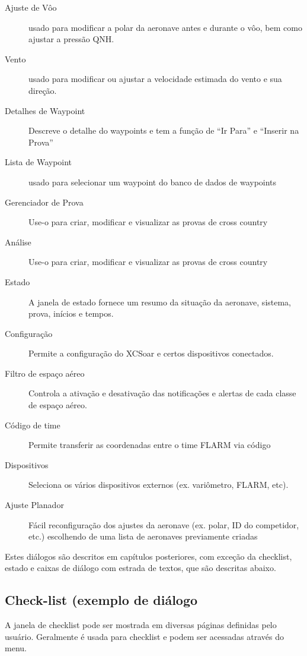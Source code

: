 \begin{description}
\item[Ajuste de Vôo] usado para modificar a polar da aeronave antes e durante o vôo, bem como ajustar a pressão QNH.
\item[Vento] usado para modificar ou ajustar a velocidade estimada do vento e sua direção. 
\item[Detalhes de Waypoint] Descreve o detalhe do waypoints e tem a função de “Ir Para” e “Inserir na Prova”
\item[Lista de Waypoint] usado para selecionar um waypoint do banco de dados de waypoints
\item[Gerenciador de Prova]Use-o para criar, modificar e visualizar as provas de cross country
\item[Análise] Use-o para criar, modificar e visualizar as provas de cross country
\item[Estado] A janela de estado fornece um resumo da situação da aeronave, sistema, prova, inícios e tempos.
\item[Configuração] Permite a configuração do XCSoar e certos dispositivos conectados.
\item[Filtro de espaço aéreo] Controla a ativação e desativação das notificações e alertas de cada classe de espaço aéreo.
\item[Código de time] Permite transferir as coordenadas entre o time FLARM via código
\item[Dispositivos]  Seleciona os vários dispositivos externos (ex. variômetro, FLARM, etc).
\item[Ajuste Planador]  Fácil reconfiguração dos ajustes da aeronave (ex. polar, ID do competidor, etc.) escolhendo de uma lista de aeronaves previamente criadas
\end{description}

Estes diálogos são descritos em capítulos posteriores, com exceção da checklist, estado e caixas de diálogo com estrada de textos, que são descritas abaixo.


\subsection*{Check-list (exemplo de diálogo}\label{sec:checklist}

A janela de checklist pode ser mostrada em diversas páginas definidas pelo usuário.  Geralmente é usada para checklist e podem ser acessadas através do menu.

\blink{}

